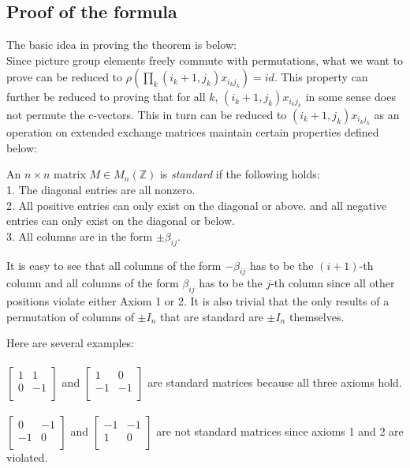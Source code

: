 \subsection{Proof of the formula}
\indent The basic idea in proving the theorem is below:\\
\indent Since picture group elements freely commute with permutations, what we want to prove can be reduced to  $\rho(\prod_{k}(i_k+1,j_k)x_{i_kj_k})=id$. This property can further be reduced to proving that for all $k$, $(i_k+1,j_k)x_{i_kj_k}$ in some sense does not permute the c-vectors. This in turn can be reduced to $(i_k+1,j_k)x_{i_kj_k}$ as an operation on extended exchange matrices maintain certain properties defined below:\\
\begin{definition}
An $n\times n$ matrix $M\in M_n(\mathbb{Z})$ is \textit{standard} if the following holds:\\
1. The diagonal entries are all nonzero.\\
2. All positive entries can only exist on the diagonal or above. and all negative entries can only exist on the diagonal or below.\\
3. All columns are in the form $\pm\beta_{ij}$.\\
\end{definition}
It is easy to see that all columns of the form $-\beta_{ij}$ has to be the $(i+1)$-th column and all columns of the form $\beta_{ij}$ has to be the $j$-th column since all other positions violate either Axiom 1 or 2. It is also trivial that the only results of a permutation of columns of $\pm I_n$ that are standard are $\pm I_n$ themselves.\\
\begin{example}
\indent Here are several examples:\\\\
$\begin{bmatrix}
1 & 1\\
0 & -1\\
\end{bmatrix}$ and
$\begin{bmatrix}
1 & 0\\
-1 & -1\\
\end{bmatrix}$ are standard matrices because all three axioms hold.\\\\
$\begin{bmatrix}
0 & -1\\
-1 & 0\\
\end{bmatrix}$ and
$\begin{bmatrix}
-1 & -1\\
1 & 0\\
\end{bmatrix}$ are not standard matrices since axioms 1 and 2 are violated.\\
\end{example}
